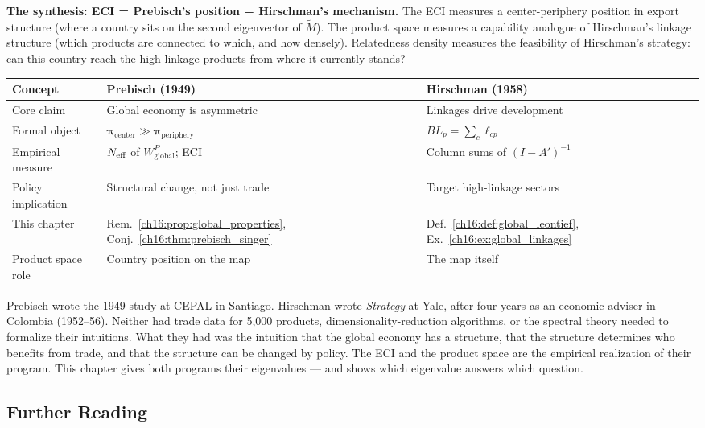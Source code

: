 \documentclass[../structural_economics_book.tex]{subfiles}
\begin{document}
\textbf{The synthesis: ECI = Prebisch's position + Hirschman's mechanism.} The ECI measures a center-periphery position in export structure (where a country sits on the second eigenvector of $\tilde{M}$). The product space measures a capability analogue of Hirschman's linkage structure (which products are connected to which, and how densely). Relatedness density measures the feasibility of Hirschman's strategy: can this country reach the high-linkage products from where it currently stands?

\begin{center}
\begin{tabularx}{\textwidth}{LLL}
\toprule
\textbf{Concept} & \textbf{Prebisch (1949)} & \textbf{Hirschman (1958)} \\
\midrule
Core claim & Global economy is asymmetric & Linkages drive development \\
Formal object & $\boldsymbol{\pi}_{\text{center}} \gg \boldsymbol{\pi}_{\text{periphery}}$ & $BL_p = \sum_c \ell_{cp}$ \\
Empirical measure & $N_{\text{eff}}$ of $W^P_{\text{global}}$; ECI & Column sums of $(I-A')^{-1}$ \\
Policy implication & Structural change, not just trade & Target high-linkage sectors \\
This chapter & Rem.~\ref{ch16:prop:global_properties}, Conj.~\ref{ch16:thm:prebisch_singer} & Def.~\ref{ch16:def:global_leontief}, Ex.~\ref{ch16:ex:global_linkages} \\
Product space role & Country position on the map & The map itself \\
\bottomrule
\end{tabularx}
\end{center}

Prebisch wrote the 1949 study at CEPAL in Santiago. Hirschman wrote \textit{Strategy} at Yale, after four years as an economic adviser in Colombia (1952--56). Neither had trade data for 5,000 products, dimensionality-reduction algorithms, or the spectral theory needed to formalize their intuitions. What they had was the intuition that the global economy has a structure, that the structure determines who benefits from trade, and that the structure can be changed by policy. The ECI and the product space are the empirical realization of their program. This chapter gives both programs their eigenvalues --- and shows which eigenvalue answers which question.


\subsection*{Further Reading}
\end{document}
